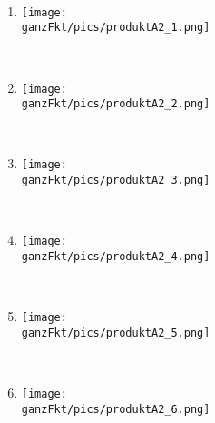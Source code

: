 \begin{Exercise}[title={Stelle die Funktionsgleichung auf. Verwende jeweils die kleinstmögliche Vielfachheit.}, label=ganzProduktA2]\\
	\begin{minipage}{\textwidth}
		\begin{minipage}{0.49\textwidth}
			\begin{enumerate}[label=\alph*)]
				\item \begin{minipage}[t]{0.95\textwidth}\vspace{-0.5\baselineskip}
					\texttt{[image: \\ganzFkt/pics/produktA2\_1.png]}
				\end{minipage}\\
				\item \begin{minipage}[t]{0.95\textwidth}\vspace{-0.5\baselineskip}
					\texttt{[image: \\ganzFkt/pics/produktA2\_2.png]}
				\end{minipage}\\
				\item \begin{minipage}[t]{0.95\textwidth}\vspace{-0.5\baselineskip}
					\texttt{[image: \\ganzFkt/pics/produktA2\_3.png]}
				\end{minipage}\\
			\end{enumerate}
		\end{minipage}
		\begin{minipage}{0.49\textwidth}
			\begin{enumerate}[label=\alph*)]
				\setcounter{enumi}{3}
				\item \begin{minipage}[t]{0.95\textwidth}\vspace{-0.5\baselineskip}
					\texttt{[image: \\ganzFkt/pics/produktA2\_4.png]}
				\end{minipage}\\
				\item \begin{minipage}[t]{0.95\textwidth}\vspace{-0.5\baselineskip}
					\texttt{[image: \\ganzFkt/pics/produktA2\_5.png]}
				\end{minipage}\\
				\item \begin{minipage}[t]{0.95\textwidth}\vspace{-0.5\baselineskip}
					\texttt{[image: \\ganzFkt/pics/produktA2\_6.png]}
				\end{minipage}\\
			\end{enumerate}
		\end{minipage}
	\end{minipage}
\end{Exercise}\newpage
